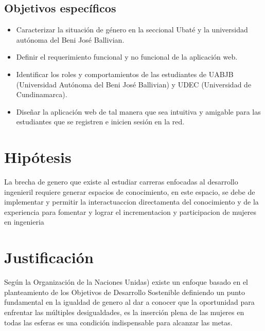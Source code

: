 \documentclass[hidelinks]{Documento}
\begin{document}
\subsection{Objetivos específicos}
  
\begin{itemize}

    \item Caracterizar la situación de género en la seccional Ubaté y la universidad autónoma del Beni José Ballivian.
    
    \item Definir el requerimiento funcional y no funcional de la aplicación web.
    
    \item Identificar los roles y comportamientos de las estudiantes de UABJB (Universidad Autónoma del Beni José Ballivian) y UDEC (Universidad de Cundinamarca).
    
    \item Diseñar la aplicación web de tal manera que sea intuitiva y amigable para las estudiantes que se registren e inicien sesión en la red.
    
\end{itemize}

\section{Hipótesis}

La brecha de genero que existe al estudiar carreras enfocadas al desarrollo ingenieril requiere generar espacios de conocimiento, en este espacio, se debe de implementar y permitir la interactuaccion directamenta del conocimiento y de la experiencia para fomentar y lograr el incrementacion y participacion de mujeres en ingenieria

\section{Justificación}

Según la Organización de la Naciones Unidas) existe un enfoque basado en el planteamiento de los  Objetivos de Desarrollo Sostenible definiendo un punto fundamental en la igualdad de genero al dar a conocer que la oportunidad para enfrentar las múltiples desigualdades, es la inserción plena de las mujeres en todas las esferas es una condición indispensable para alcanzar las metas. \cite{OrganizaciondelasNacionesUnidas2016}
\end{document}
